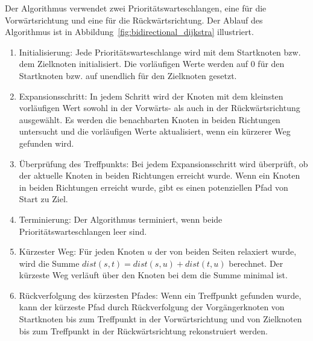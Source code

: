 Der Algorithmus verwendet zwei Prioritätswarteschlangen, eine für die Vorwärtsrichtung und eine für
die Rückwärtsrichtung. Der Ablauf des Algorithmus ist in Abbildung~\ref{fig:bidirectional_dijkstra}
illustriert.

\begin{enumerate}
    \item Initialisierung: Jede Prioritätswarteschlange wird mit dem Startknoten bzw. dem Zielknoten
          initialisiert. Die vorläufigen Werte werden auf 0 für den Startknoten bzw. auf unendlich
          für den Zielknoten gesetzt.

    \item Expansionsschritt: In jedem Schritt wird der Knoten mit dem kleinsten vorläufigen Wert
          sowohl in der Vorwärts- als auch in der Rückwärtsrichtung ausgewählt. Es werden die
          benachbarten Knoten in beiden Richtungen untersucht und die vorläufigen Werte
          aktualisiert, wenn ein kürzerer Weg gefunden wird.

    \item Überprüfung des Treffpunkts: Bei jedem Expansionsschritt wird überprüft, ob der aktuelle
          Knoten in beiden Richtungen erreicht wurde. Wenn ein Knoten in beiden Richtungen erreicht
          wurde, gibt es einen potenziellen Pfad von Start zu Ziel.

    \item Terminierung: Der Algorithmus terminiert, wenn beide Prioritätswarteschlangen
          leer sind.

    \item Kürzester Weg: Für jeden Knoten $u$ der von beiden Seiten relaxiert wurde, wird die Summe
          $dist(s,t) = dist(s,u) + dist(t,u)$ berechnet. Der kürzeste Weg verläuft über den Knoten bei dem
          die Summe minimal ist.

    \item Rückverfolgung des kürzesten Pfades: Wenn ein Treffpunkt gefunden wurde, kann der kürzeste
          Pfad durch Rückverfolgung der Vorgängerknoten von Startknoten bis zum Treffpunkt in der
          Vorwärtsrichtung und von Zielknoten bis zum Treffpunkt in der Rückwärtsrichtung
          rekonstruiert werden.
\end{enumerate}


